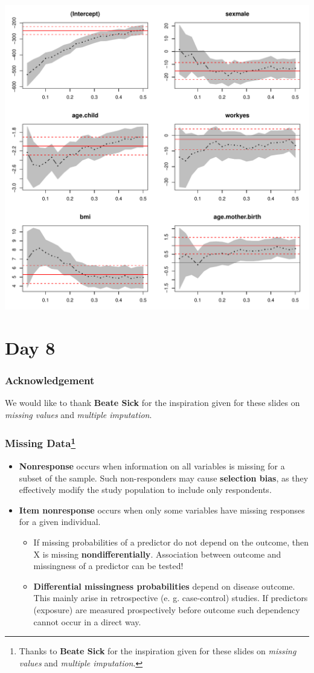\documentclass{beamer}\usepackage[]{graphicx}\usepackage[]{color}
\newenvironment{knitrout}{}{} %
\begin{document}
{{{\begin{frame}[fragile]
\begin{knitrout}
{\centering \includegraphics[width=0.6\linewidth]{figure/unnamed-chunk-90-1} 

}



\end{knitrout}
\end{frame}

\section{Day 8}
\usebackgroundtemplate{}
\begin{frame}
\frametitle{Acknowledgement}
\LARGE
We would like to thank \textbf{Beate Sick} for the inspiration given for these slides on \textit{missing values} and \textit{multiple imputation}.
\end{frame}

\usebackgroundtemplate{}
\begin{frame}
\frametitle{Missing Data\footnote{Thanks to \textbf{Beate Sick} for the
inspiration given for these slides on \textit{missing values} and
\textit{multiple imputation}.}}
\small
\begin{itemize}
\item \textbf{Nonresponse} occurs when information on all variables is missing
for a subset of the sample. Such non-responders may cause \textbf{selection bias},
as they effectively modify the study population to include only respondents.
\item \textbf{Item nonresponse} occurs when only some variables have missing
responses for a given individual.
\begin{itemize}
\item If missing probabilities of a predictor do not depend on the outcome,
then X is missing \textbf{nondifferentially}. Association between outcome
and missingness of a predictor can be tested!
\item \textbf{Differential missingness probabilities} depend on disease outcome.
This mainly arise in retrospective (e. g. case-control) studies.
If predictors (exposure) are measured prospectively before outcome
such dependency cannot occur in a direct way.
\end{itemize}
\end{itemize}
\end{frame}

}}}
\end{document}
